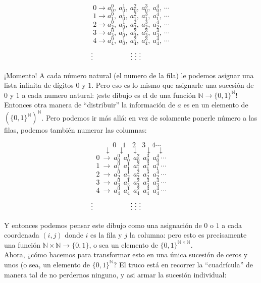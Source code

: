 \documentclass[10pt,a4paper]{article}
\newcommand{\N}{\mathbb{N}}
\newcommand{\ra}{\rightarrow}
\begin{document}
\[ 0 \ra a_0^0,\ a_0^1,\ a_0^2,\ a_0^3,\ a_0^4,\ \cdots \]
\[ 1 \ra a_1^0,\ a_0^1,\ a_1^2,\ a_1^3,\ a_1^4,\ \cdots \]
\[ 2 \ra a_2^0,\ a_0^1,\ a_2^2,\ a_2^3,\ a_2^4,\ \cdots \]
\[ 3 \ra a_3^0,\ a_0^1,\ a_3^2,\ a_3^3,\ a_3^4,\ \cdots \]
\[ 4 \ra a_4^0,\ a_0^1,\ a_4^2,\ a_4^3,\ a_4^4,\  \cdots \]
\[\ \ \vdots\ \hspace{50px} \vdots\ \vdots\ \vdots \hspace{50px} \]

¡Momento! A cada número natural (el numero de la fila) le podemos asignar una lista infinita de dígitos $0$ y $1$. Pero eso es lo mismo que asignarle una sucesión de $0$ y $1$ a cada numero natural: ¡este dibujo es el de una función $\N \ra \{0, 1\}^\N$! Entonces otra manera de ``distribuir'' la información de $a$ es en un elemento de $(\{0, 1\}^\N)^\N$. Pero podemos ir más allá: en vez de solamente ponerle número a las filas, podemos también numerar las columnas:


\[\ \ \ \ \ \ \ 0\ \ \ \ 1\ \ \ \ 2\ \ \ \ 3\ \ \ \ 4\cdots \]
\[\ \ \ \ \ \ \ \downarrow\ \ \ \ \downarrow\ \ \ \ \downarrow\ \ \ \ \downarrow\ \ \ \downarrow\ \ \  \]
\[ 0\  \ra\  a_0^0\ \ a_0^1\ \ a_0^2\ \ a_0^3\ \ a_0^4\  \cdots \]
\[ 1\  \ra\  a_1^0\ \ a_1^1\ \ a_1^2\ \ a_1^3\ \ a_1^4\  \cdots \]
\[ 2\  \ra\  a_2^0\ \ a_2^1\ \ a_2^2\ \ a_2^3\ \ a_2^4\  \cdots \]
\[ 3\ \ra\ a_3^0\ \ a_3^1\ \ a_3^2\ \ a_3^3\ \ a_3^4\  \cdots \]
\[ 4\ \ra\  a_4^0\ \ a_4^1\ \ a_4^2\ \ a_4^3\ \ a_4^4\  \cdots \]
\[\ \ \vdots\ \hspace{50px} \vdots\ \vdots\ \vdots \hspace{50px} \]


Y entonces podemos pensar este dibujo como una asignación de $0$ o $1$ a cada coordenada $(i, j)$ donde $i$ es la fila y $j$ la columna: pero esto es precisamente una función $\N \times \N \ra \{0, 1\}$, o sea un elemento de $\{0, 1\}^{\N \times \N}$.\\ 


Ahora, ¿cómo hacemos para transformar esto en una única sucesión de ceros y unos (o sea, un elemento de $\{ 0, 1 \}^\N$? El truco  está en recorrer la ``cuadrícula'' de manera tal de no perdernos ninguno, y asi armar la sucesión individual:
\end{document}
